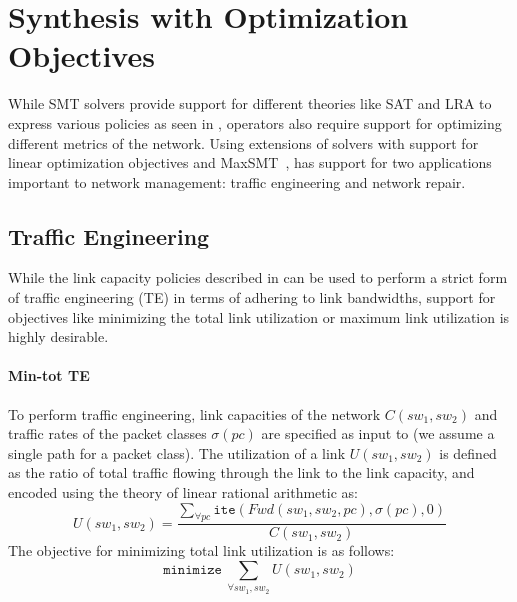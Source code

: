 \section{Synthesis with Optimization Objectives}
\label{sec:optimization}

While SMT solvers provide support for different theories like SAT and
LRA to express various policies as seen in , 
operators also require support for optimizing different metrics of the network. Using extensions of solvers with support
 for linear optimization objectives and MaxSMT~\cite{maxsmt}, 
 \name has support for two applications important to network
 management: 
 traffic engineering and network repair.

\subsection{Traffic Engineering}
While the link capacity policies described in  can
be used to perform a strict form of traffic engineering (TE) in terms of 
adhering to link bandwidths, support for objectives
like minimizing the total link utilization or maximum link utilization
is highly desirable.

\paragraph{Min-tot TE}
To perform traffic engineering, link capacities of the network $C(sw_1, sw_2)$ and traffic 
rates of the packet classes $\sigma(pc)$ are specified as input to \name (we assume a single
path for a packet class). The utilization 
of a link $U(sw_1, sw_2)$ is defined as the ratio of total traffic flowing through the link to the 
link capacity, and encoded using the theory of linear rational arithmetic as:
\begin{equation}
U(sw_1, sw_2) = \frac{\sum_{\forall pc} \texttt{ite}(Fwd(sw_1,sw_2, pc), \sigma(pc), 0)} {C(sw_1, sw_2)}
\end{equation}
The objective for minimizing total link utilization is as follows:
\begin{equation}
	\texttt{minimize}\ \sum_{\forall sw_1, sw_2} U(sw_1, sw_2)
\end{equation}
